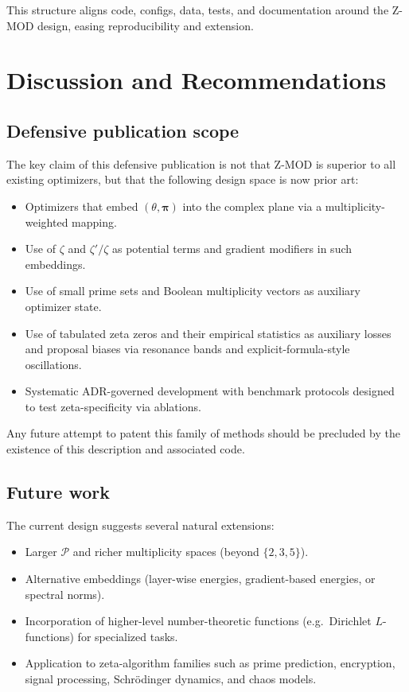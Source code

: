 \documentclass[11pt]{article}
\begin{document}
This structure aligns code, configs, data, tests, and documentation around the Z-MOD design, easing reproducibility and extension.

\section{Discussion and Recommendations}

\subsection{Defensive publication scope}

The key claim of this defensive publication is not that Z-MOD is superior to all existing optimizers, but that the following design space is now prior art:

\begin{itemize}[leftmargin=*]
  \item Optimizers that embed $(\theta,\bm{\pi})$ into the complex plane via a multiplicity-weighted mapping.
  \item Use of $\zeta$ and $\zeta'/\zeta$ as potential terms and gradient modifiers in such embeddings.
  \item Use of small prime sets and Boolean multiplicity vectors as auxiliary optimizer state.
  \item Use of tabulated zeta zeros and their empirical statistics as auxiliary losses and proposal biases via resonance bands and explicit-formula-style oscillations.
  \item Systematic ADR-governed development with benchmark protocols designed to test zeta-specificity via ablations.
\end{itemize}

Any future attempt to patent this family of methods should be precluded by the existence of this description and associated code.

\subsection{Future work}

The current design suggests several natural extensions:

\begin{itemize}[leftmargin=*]
  \item Larger $\mathcal{P}$ and richer multiplicity spaces (beyond $\{2,3,5\}$).
  \item Alternative embeddings (layer-wise energies, gradient-based energies, or spectral norms).
  \item Incorporation of higher-level number-theoretic functions (e.g.\ Dirichlet $L$-functions) for specialized tasks.
  \item Application to zeta-algorithm families such as prime prediction, encryption, signal processing, Schrödinger dynamics, and chaos models.
\end{itemize}
\end{document}
